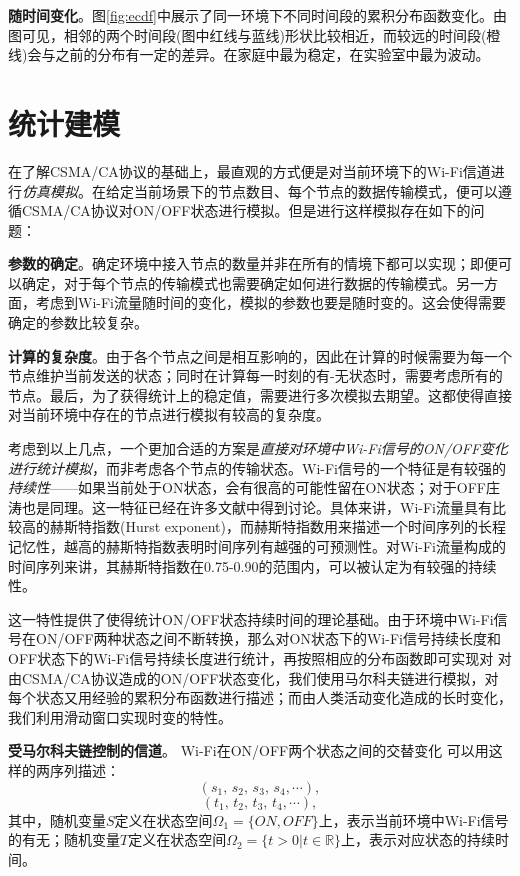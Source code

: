 \textbf{随时间变化}。图\ref{fig:ecdf}中展示了同一环境下不同时间段的累积分布函数变化。由图可见，相邻的两个时间段(图中红线与蓝线)形状比较相近，而较远的时间段(橙线)会与之前的分布有一定的差异。在家庭中最为稳定，在实验室中最为波动。
\section{统计建模}
\label{sec:model}
在了解CSMA/CA协议的基础上，最直观的方式便是对当前环境下的Wi-Fi信道进行\emph{仿真模拟}。在给定当前场景下的节点数目、每个节点的数据传输模式，便可以遵循CSMA/CA协议对ON/OFF状态进行模拟。但是进行这样模拟存在如下的问题：

\textbf{参数的确定}。确定环境中接入节点的数量并非在所有的情境下都可以实现；即便可以确定，对于每个节点的传输模式也需要确定如何进行数据的传输模式。另一方面，考虑到Wi-Fi流量随时间的变化，模拟的参数也要是随时变的。这会使得需要确定的参数比较复杂。

\textbf{计算的复杂度}。由于各个节点之间是相互影响的，因此在计算的时候需要为每一个节点维护当前发送的状态；同时在计算每一时刻的有-无状态时，需要考虑所有的节点。最后，为了获得统计上的稳定值，需要进行多次模拟去期望。这都使得直接对当前环境中存在的节点进行模拟有较高的复杂度。

考虑到以上几点，一个更加合适的方案是\emph{直接对环境中Wi-Fi信号的ON/OFF变化进行统计模拟}，而非考虑各个节点的传输状态。Wi-Fi信号的一个特征是有较强的\emph{持续性}——如果当前处于ON状态，会有很高的可能性留在ON状态；对于OFF庄涛也是同理。这一特征已经在许多文献\cite{}中得到讨论。具体来讲，Wi-Fi流量具有比较高的赫斯特指数(Hurst exponent)，而赫斯特指数用来描述一个时间序列的长程记忆性，越高的赫斯特指数表明时间序列有越强的可预测性。对Wi-Fi流量构成的时间序列来讲，其赫斯特指数在0.75-0.90的范围内，可以被认定为有较强的持续性。

这一特性提供了使得统计ON/OFF状态持续时间的理论基础。由于环境中Wi-Fi信号在ON/OFF两种状态之间不断转换，那么对ON状态下的Wi-Fi信号持续长度和OFF状态下的Wi-Fi信号持续长度进行统计，再按照相应的分布函数即可实现对
对由CSMA/CA协议造成的ON/OFF状态变化，我们使用马尔科夫链进行模拟，对每个状态又用经验的累积分布函数进行描述；而由人类活动变化造成的长时变化，我们利用滑动窗口实现时变的特性。

\textbf{受马尔科夫链控制的信道}。
Wi-Fi在ON/OFF两个状态之间的交替变化
可以用这样的两序列描述：
\begin{equation}
\label{equ:state}
(s_1, \,  s_2, \, s_3 , \, s_4, \cdots),
\end{equation}
\begin{equation}
\label{equ:time}
(t_{1}, \, t_{2}, \, t_{3}, \, t_{4}, \cdots),
\end{equation}
其中，随机变量$S$定义在状态空间$\Omega_1 = \{ON,OFF\}$上，表示当前环境中Wi-Fi信号的有无；随机变量$T$定义在状态空间$\Omega_2 = \{t > 0 | t \in \mathbb{R}\}$上，表示对应状态的持续时间。

